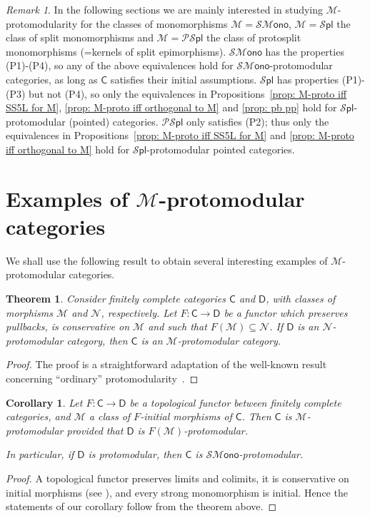 \documentclass[10pt,a4paper]{amsart}
\theoremstyle{plain}
\newtheorem{theorem}[subsection]{Theorem}
\newtheorem{corollary}[subsection]{Corollary}
\theoremstyle{definition}
\theoremstyle{remark}
\newtheorem{remark}[subsection]{Remark}
\newcommand{\todo}[1]{{\color{red} [#1]}}
\newcommand{\C}{\ensuremath{\mathsf{C}}}
\newcommand{\D}{\ensuremath{\mathsf{D}}}
\newcommand{\M}{\ensuremath{\mathscr{M}}}
\newcommand{\N}{\ensuremath{\mathscr{N}}}
\newcommand{\SMono}{\ensuremath{\mathscr{SM}\mathsf{ono}}}
\newcommand{\Spl}{\ensuremath{\mathscr{S}\mathsf{pl}}}
\newcommand{\PSpl}{\ensuremath{\mathscr{PS}\mathsf{pl}}}
\begin{document}
\begin{remark} In the following sections we are mainly interested in studying $\M$-protomodularity for the classes of monomorphisms $\M=\SMono$, $\M=\Spl$ the class of split monomorphisms and $\M=\PSpl$ the class of protosplit monomorphisms (=kernels of split epimorphisms). $\SMono$ has the properties (P1)-(P4), so any of the above equivalences hold for $\SMono$-protomodular categories, as long as $\C$ satisfies their initial assumptions. $\Spl$ has properties (P1)-(P3) but not (P4), so only the equivalences in Propositions~\ref{prop: M-proto iff SS5L for M}, \ref{prop: M-proto iff orthogonal to M} and \ref{prop: pb pp} hold for $\Spl$-protomodular (pointed) categories. $\PSpl$ only satisfies (P2); thus only the equivalences in Propositions~\ref{prop: M-proto iff SS5L for M} and \ref{prop: M-proto iff orthogonal to M} hold for $\Spl$-protomodular pointed categories.
\end{remark}

\section{Examples of $\M$-protomodular categories}\label{sec: Exs}

We shall use the following result to obtain several interesting examples of $\M$-protomodular categories.

\begin{theorem}\label{thm: F:CC->DD} Consider finitely complete categories $\C$ and $\D$, with classes of morphisms $\M$ and $\N$, respectively. Let $F\colon \C\to \D$ be a  functor which preserves pullbacks, is conservative on $\M$ and such that $F(\M)\subseteq\N$. If $\D$ is an $\N$-protomodular category, then $\C$ is an $\M$-protomodular category.
\end{theorem}
\begin{proof} The proof is a straightforward adaptation of the well-known result concerning  ``ordinary'' protomodularity~\cite{NEKEAC}.
\end{proof}

\begin{corollary}\label{cor:top}
Let $F\colon \C\to \D$ be a topological functor between finitely complete categories, and $\M$ a class of $F$-initial morphisms of $\C$. Then $\C$ is $\M$-protomodular provided that $\D$ is $F(\M)$-protomodular.

In particular, if $\D$ is protomodular, then $\C$ is $\SMono$-protomodular.
\end{corollary}
\begin{proof}
A topological functor preserves limits and colimits, it is conservative on initial morphisms (see \cite{ST}), and every strong monomorphism is initial. Hence the statements of our corollary follow from the theorem above.
\end{proof}
\end{document}
